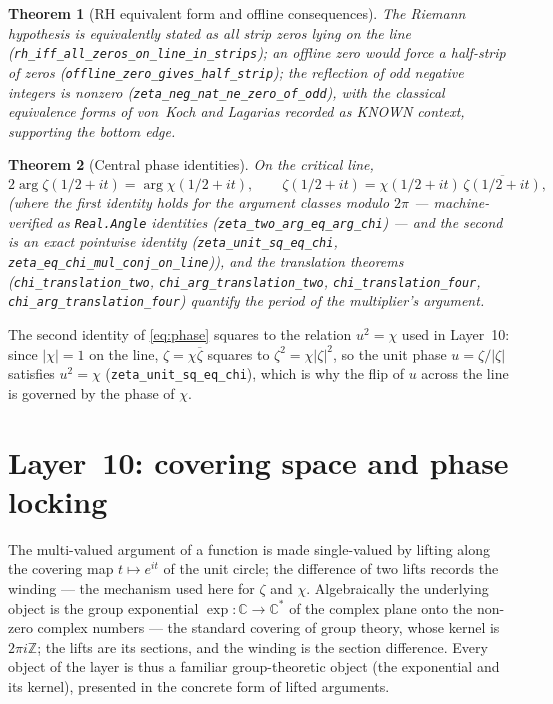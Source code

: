 \documentclass{article}
\newtheorem{theorem}{Theorem}[section]
\newcommand{\zt}{\zeta}
\newcommand{\Xchi}{\chi}
\begin{document}
\begin{theorem}[RH equivalent form and offline consequences]
\label{thm:rheq}
The Riemann hypothesis is equivalently stated as all strip zeros lying on
the line (\texttt{rh\_iff\_all\_zeros\_on\_line\_in\_strips}); an offline
zero would force a half-strip of zeros
(\texttt{offline\_zero\_gives\_half\_strip}); the reflection of odd
negative integers is nonzero (\texttt{zeta\_neg\_nat\_ne\_zero\_of\_odd}),
with the classical equivalence forms of von~Koch \cite{vonkoch1901} and
Lagarias \cite{lagarias2002} recorded as KNOWN context,
supporting the bottom edge.
\end{theorem}

\begin{theorem}[Central phase identities]
\label{thm:phaseid}
On the critical line,
\begin{equation}
\label{eq:phase}
2\arg\zt(1/2+it)=\arg\Xchi(1/2+it),\qquad
\zt(1/2+it)=\Xchi(1/2+it)\,\overline{\zt(1/2+it)},
\end{equation}
(where the first identity holds for the argument \emph{classes} modulo
$2\pi$ --- machine-verified as \texttt{Real.Angle} identities
(\texttt{zeta\_two\_arg\_eq\_arg\_chi}) ---
and the second is an exact pointwise identity
(\texttt{zeta\_unit\_sq\_eq\_chi}, \texttt{zeta\_eq\_chi\_mul\_conj\_on\_line})),
and the translation theorems
(\texttt{chi\_translation\_two}, \texttt{chi\_arg\_translation\_two},
\texttt{chi\_translation\_four}, \texttt{chi\_arg\_translation\_four})
quantify the period of the multiplier's argument.
\end{theorem}

The second identity of \eqref{eq:phase} squares to the relation
$u^2=\Xchi$ used in Layer~10: since $|\Xchi|=1$ on the line,
$\zt=\Xchi\overline{\zt}$ squares to $\zt^2=\Xchi|\zt|^2$, so the unit
phase $u=\zt/|\zt|$ satisfies $u^2=\Xchi$ (\texttt{zeta\_unit\_sq\_eq\_chi}),
which is why the flip of $u$
across the line is governed by the phase of $\Xchi$.

\section{Layer~10: covering space and phase locking}
\label{sec:L10}

The multi-valued argument of a function is made single-valued by lifting
along the covering map $t\mapsto e^{it}$ of the unit circle; the difference
of two lifts records the winding --- the mechanism used here for
$\zt$ and $\Xchi$. Algebraically the underlying object is the group
exponential $\exp:\mathbb C\to\mathbb C^*$ of the complex plane onto the
non-zero complex numbers --- the standard covering of group theory, whose
kernel is $2\pi i\mathbb Z$; the lifts are its sections, and the winding
is the section difference. Every object of the layer is thus a familiar
group-theoretic object (the exponential and its kernel), presented in
the concrete form of lifted arguments.
\end{document}
